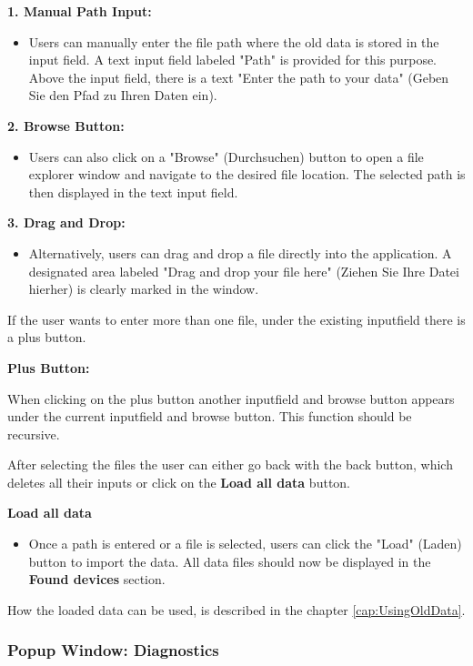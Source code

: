 \documentclass[]{scrreprt}
\begin{document}
\textbf{1. Manual Path Input:}
\begin{itemize}
    \item Users can manually enter the file path where the old data is stored in the input field.
    A text input field labeled "Path" is provided for this purpose.
     Above the input field, there is a text "Enter the path to your data" (Geben Sie den Pfad zu Ihren Daten ein).
\end{itemize}

\textbf{2. Browse Button:}
\begin{itemize}
    \item Users can also click on a "Browse" (Durchsuchen) button to open a file explorer window and navigate to the desired file location.
     The selected path is then displayed in the text input field.
\end{itemize}

\textbf{3. Drag and Drop:}
\begin{itemize}
    \item Alternatively, users can drag and drop a file directly into the application.
     A designated area labeled "Drag and drop your file here" (Ziehen Sie Ihre Datei hierher) is clearly marked in the window.
\end{itemize}

If the user wants to enter more than one file, under the existing inputfield there is a plus button. 

\textbf{Plus Button:}
\begin{itemize}
    When clicking on the plus button another inputfield and browse button appears under the current inputfield and browse button. This function should be recursive. 
\end{itemize}

After selecting the files the user can either go back with the back button, which deletes all their inputs or click on the \textbf{Load all data} button. 

\textbf{Load all data}
\begin{itemize}
    \item Once a path is entered or a file is selected, users can click the "Load" (Laden) button to import the data. 
    All data files should now be displayed in the \textbf{Found devices} section. 
\end{itemize}

How the loaded data can be used, is described in the chapter \ref{cap:UsingOldData}. 

\subsubsection{Popup Window: Diagnostics}
\end{document}
